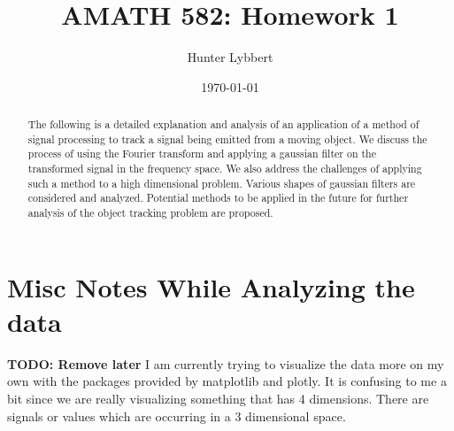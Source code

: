 \documentclass[11pt]{amsart}
\title{AMATH 582: Homework 1}
\author{Hunter Lybbert} %
\date{\today} %
\begin{document}
\maketitle

\begin{abstract}
    The following is a detailed explanation and analysis of an application of a method of signal processing to track a signal being emitted from a moving object. We discuss the process of using the Fourier transform and applying a gaussian filter on the transformed signal in the frequency space. We also address the challenges of applying such a method to a high dimensional problem. Various shapes of gaussian filters are considered and analyzed. Potential methods to be applied in the future for further analysis of the object tracking problem are proposed. 
\end{abstract}

\section{Misc Notes While Analyzing the data}\label{sec:Notes}
\textbf{TODO: Remove later}
I am currently trying to visualize the data more on my own with the packages provided by matplotlib and plotly.
It is confusing to me a bit since we are really visualizing something that has 4 dimensions. There are signals or values which are occurring in a 3 dimensional space.
\end{document}
